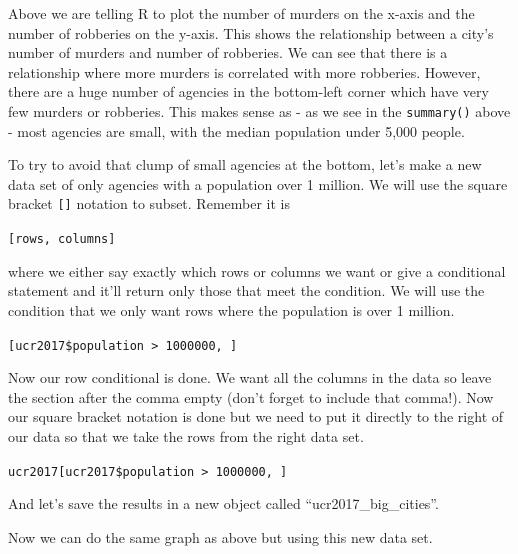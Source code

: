 \documentclass[
  12pt,
]{book}
\newenvironment{Shaded}{\begin{snugshade}}{\end{snugshade}}
\newcommand{\DecValTok}[1]{\textcolor[rgb]{0.06,0.06,0.06}{#1}}
\newcommand{\FunctionTok}[1]{\textcolor[rgb]{0,0,0}{#1}}
\newcommand{\NormalTok}[1]{#1}
\newcommand{\OtherTok}[1]{\textcolor[rgb]{0.37,0.37,0.37}{#1}}
\newcommand{\SpecialCharTok}[1]{\textcolor[rgb]{0,0,0}{#1}}
\begin{document}
Above we are telling R to plot the number of murders on the x-axis and the number of robberies on the y-axis. This shows the relationship between a city's number of murders and number of robberies. We can see that there is a relationship where more murders is correlated with more robberies. However, there are a huge number of agencies in the bottom-left corner which have very few murders or robberies. This makes sense as - as we see in the \texttt{summary()} above - most agencies are small, with the median population under 5,000 people.

To try to avoid that clump of small agencies at the bottom, let's make a new data set of only agencies with a population over 1 million. We will use the square bracket \texttt{{[}{]}} notation to subset. Remember it is

\texttt{{[}rows,\ columns{]}}

where we either say exactly which rows or columns we want or give a conditional statement and it'll return only those that meet the condition. We will use the condition that we only want rows where the population is over 1 million.

\texttt{{[}ucr2017\$population\ \textgreater{}\ 1000000,\ {]}}

Now our row conditional is done. We want all the columns in the data so leave the section after the comma empty (don't forget to include that comma!). Now our square bracket notation is done but we need to put it directly to the right of our data so that we take the rows from the right data set.

\texttt{ucr2017{[}ucr2017\$population\ \textgreater{}\ 1000000,\ {]}}

And let's save the results in a new object called ``ucr2017\_big\_cities''.

\begin{Shaded}
\end{Shaded}

Now we can do the same graph as above but using this new data set.

\begin{Shaded}
\end{Shaded}
\end{document}

